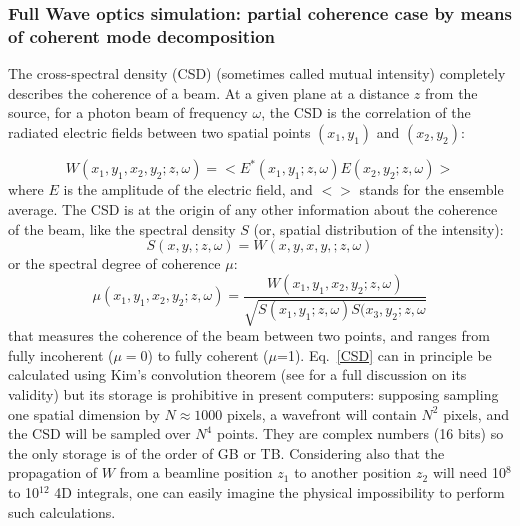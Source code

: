 \documentclass{iucr}              %
\begin{document}
% 
% 
%  
\subsubsection{Full Wave optics simulation: partial coherence case by means of coherent mode decomposition}
\label{comsyl}
% 

The cross-spectral density (CSD) (sometimes called mutual intensity) completely describes the coherence of a beam. 
At a given plane at a distance $z$ from the source, for a photon beam of frequency $\omega$, the CSD is the correlation of the radiated electric fields between two spatial points $(x_1,y_1)$ and $(x_2,y_2)$:

\begin{equation}\label{CSD}
W(x_1,y_1,x_2,y_2;z,\omega) = <E^{*}(x_1,y_1; z,\omega) E(x_2,y_2;z,\omega)>
\end{equation}
where $E$ is the amplitude of the electric field, and $<>$ stands for the ensemble average. The CSD is at the origin of any other information about the coherence of the beam, like the spectral density $S$ (or, spatial distribution of the intensity): 
\begin{equation}\label{SD}
S(x,y,;z,\omega) = W(x,y,x,y,;z,\omega)
\end{equation}
or the spectral degree of coherence $\mu$:
\begin{equation}\label{SDC}
\mu(x_1,y_1,x_2,y_2;z,\omega) = \frac{W(x_1,y_1,x_2,y_2;z,\omega)}{\sqrt{ S(x_1,y_1;z,\omega) S(x_3,y_2;z,\omega}}
\end{equation}
that measures the coherence of the beam between two points, and ranges from fully incoherent ($\mu=0$) to fully coherent ($\mu$=1). 
Eq.~\ref{CSD} can in principle be calculated using Kim's convolution theorem \cite{kim1986} (see \cite{geloni2008} for a full discussion on its validity) but its storage is prohibitive in present computers: supposing sampling one spatial dimension by $N\approx1000$ pixels, a wavefront will contain $N^2$ pixels, and the CSD will be sampled over $N^4$ points. They are complex numbers (16 bits) so the only storage is of the order of GB or TB. Considering also that the propagation of $W$ from a beamline position $z_1$ to another position $z_2$ will need 10$^8$ to 10$^{12}$ 4D integrals, one can easily imagine the physical impossibility to perform such calculations. 
\end{document}
